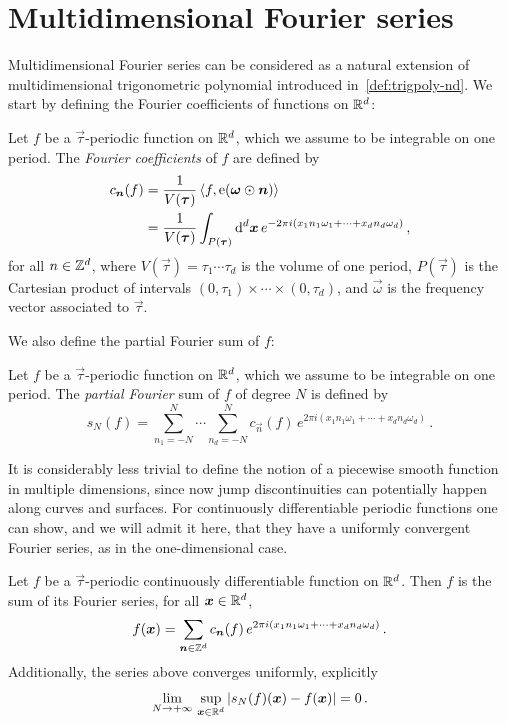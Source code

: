 \section{Multidimensional Fourier series}
Multidimensional Fourier series can be considered as a natural extension of
multidimensional trigonometric polynomial introduced in~\cref{def:trigpoly-nd}. We start
by defining the Fourier coefficients of functions on $\mathbb{R}^d$:
\begin{definition}
	Let $f$ be a $\vec{\tau}$-periodic function on $\mathbb{R}^d$, which we assume to be integrable
	on one period. The \emph{Fourier coefficients} of $f$ are defined by
	\begin{align}
		c_{\bm{n}}(f) & =\frac{1}{V(\bm{\tau})}\braket{f,\operatorname{e}(\bm{\omega}\odot\bm{n})}\notag \\
		               & =\frac{1}{V(\bm{\tau})}
		\int_{P(\bm{\tau})}\mathrm{d}^d\bm{x}\,e^{-2\pi
				i(x_1n_1\omega_1+\cdots+x_dn_d\omega_d)}\,,
	\end{align}
	for all $n\in\mathbb{Z}^d$, where $V(\vec{\tau})=\tau_1\cdots\tau_d$ is the volume of one
	period, $P(\vec{\tau})$ is the Cartesian product of intervals
	$(0,\tau_1)\times\cdots\times(0,\tau_d)$, and $\vec{\omega}$ is the frequency vector
	associated to $\vec{\tau}$.
\end{definition}
We also define the partial Fourier sum of $f$:
\begin{definition}
	Let $f$ be a $\vec{\tau}$-periodic function on $\mathbb{R}^d$, which we assume to be integrable
	on one period. The \emph{partial Fourier} sum of $f$ of degree $N$ is defined by
	\begin{equation}
		s_N(f)=\sum_{n_1=-N}^{N}\cdots\sum_{n_d=-N}^{N}c_{\vec{n}}(f)\,
		e^{2\pi i(x_1n_1\omega_1+\cdots+x_dn_d\omega_d)}\,.
	\end{equation}
\end{definition}
It is considerably less trivial to define the notion of a piecewise smooth function in
multiple dimensions, since now jump discontinuities can potentially happen along curves
and surfaces. For continuously differentiable periodic functions one can show, and we will
admit it here, that they have a uniformly convergent Fourier series, as in the
one-dimensional case.
\begin{theorem}
	Let $f$ be a $\vec{\tau}$-periodic continuously differentiable function on $\mathbb{R}^d$. Then
	$f$ is the sum of its Fourier series, \ie for all $\bm{x}\in\mathbb{R}^d$,
	\begin{equation}
		f(\bm{x})=\sum_{\bm{n}\in\mathbb{Z}^d}c_{\bm{n}}(f)\,
		e^{2\pi i(x_1n_1\omega_1+\cdots+x_dn_d\omega_d)}\,.
	\end{equation}
	Additionally, the series above converges uniformly, explicitly
	\begin{equation}
		\lim_{N\to+\infty}\,\sup_{\bm{x}\in\mathbb{R}^d}|s_N(f)(\bm{x})-f(\bm{x})|=0\,.
	\end{equation}
\end{theorem}
